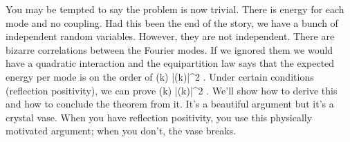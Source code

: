 You may be tempted to say the problem is now trivial. There is energy for each mode and no coupling. Had this been the end of the story, we have a bunch of independent random variables. However, they are not independent. There are bizarre correlations between the Fourier modes. If we ignored them we would have a quadratic interaction and the equipartition law says that the expected energy per mode is on the order of 
\be
{}(k) |\widehat{\sigma}(k)|^2 \approx {}.
\ee
Under certain conditions (reflection positivity), we can prove
\be
{}(k) |\widehat{\sigma}(k)|^2 \le {}.
\ee
We'll show how to derive this and how to conclude the theorem from it. It's a beautiful argument but it's a crystal vase. When you have reflection positivity, you use this physically motivated argument; when you don't, the vase breaks.













